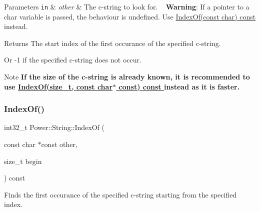 \begin{DoxyParams}[1]{Parameters}
\mbox{\tt in}  & {\em other} & The c-\/string to look for. ~\newline
 {\bfseries Warning}\+: If a pointer to a char variable is passed, the behaviour is undefined. Use \hyperlink{class_power_1_1_string_a3950fad3517697abedcda15b4d310e14}{Index\+Of(const char) const }instead. \\
\hline
\end{DoxyParams}
\begin{DoxyReturn}{Returns}
The start index of the first occurance of the specified c-\/string. 

Or -\/1 if the specified c-\/string does not occur. 
\end{DoxyReturn}
\begin{DoxyNote}{Note}
{\bfseries If the size of the c-\/string is already known, it is recommended to use \hyperlink{class_power_1_1_string_a691504e54435a9b9d8d92c4f558d5fa3}{Index\+Of(size\+\_\+t, const char$\ast$ const) const }instead as it is faster.} 
\end{DoxyNote}
\mbox{\label{class_power_1_1_string_a6b664e38ec1fd8f25754f8bf034e93bd}} 
\subsubsection{\texorpdfstring{Index\+Of()}{IndexOf()}\hspace{0.1cm}{\footnotesize\ttfamily [5/12]}}
{\footnotesize\ttfamily int32\+\_\+t Power\+::\+String\+::\+Index\+Of (\begin{DoxyParamCaption}\item[{const char $\ast$const}]{other,  }\item[{size\+\_\+t}]{begin }\end{DoxyParamCaption}) const\hspace{0.3cm}{\ttfamily [inline]}}



Finds the first occurance of the specified c-\/string starting from the specified index. 


